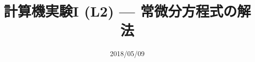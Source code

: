\documentclass[dvipdfmx]{beamer}
\title{計算機実験I (L2) --- 常微分方程式の解法}
\date{2018/05/09}
\begin{document}
\begin{frame}
  \titlepage
  \tableofcontents
\end{frame}





\end{document}
